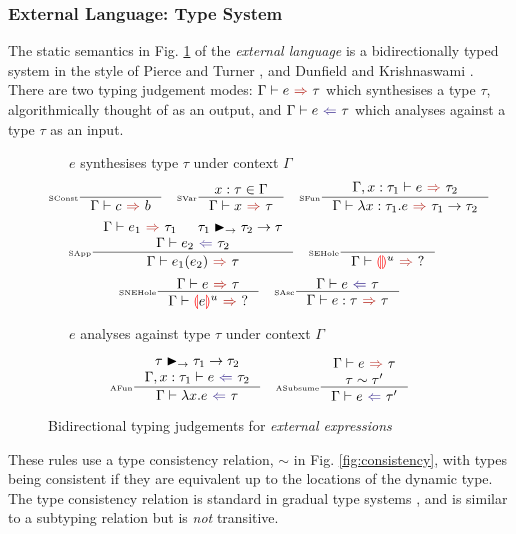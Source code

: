 \subsubsection{External Language: Type System}
The static semantics in Fig. \ref{fig:typing} of the \textit{external language} is a bidirectionally typed system in the style of Pierce and Turner \cite{LocalInference}, and Dunfield and Krishnaswami \cite{BidirectionalTypes}. There are two typing judgement modes: $\synthesis{e}{\tau}$ which synthesises a type $\tau$, algorithmically thought of as an output, and $\analysis{e}{\tau}$ which analyses against a type $\tau$ as an input.\par 
\begin{figure}[H]
\small
{}\ \ \ $e$ synthesises type $\tau$ under context $\Gamma$
\tiny
\[\inference[\tiny SConst]{}{\synthesis{c}{b}} \quad
\inference[\tiny SVar]{x : \tau \in \Gamma}{\synthesis{x}{\tau}} \quad 
\inference[\tiny SFun]{\synthesis[\Gamma,x:\tau_1]{e}{\tau_2}}{\synthesis{\lambda x:\tau_1.e}{\tau_1 \to \tau_2}}\]
\[\inference[\tiny SApp]{\synthesis{e_1}{\tau_1} & \tau_1 \funmatch \tau_2 \to \tau \\ \analysis{e_2}{\tau_2}}{\synthesis{e_1(e_2)}{\tau}} \quad 
\inference[\tiny SEHole]{}{\synthesis{\hole^u}{?}} \quad \]
\[\inference[\tiny SNEHole]{\synthesis{e}{\tau}}{\synthesis{\hole[e]^u}{?}}\quad 
\inference[\tiny SAsc]{\analysis{e}{\tau}}{\synthesis{e : \tau}{\tau}}\]

\small
{}\ \ \ $e$ analyses against type $\tau$ under context $\Gamma$

\tiny
\[\inference[\tiny AFun]{\tau \funmatch \tau_1 \to \tau_2\\ \analysis[\Gamma, x:\tau_1]{e}{\tau_2}}{\analysis{\lambda x.e}{\tau}} \quad 
\inference[\tiny ASubsume]{\synthesis{e}{\tau}\\ \tau \sim \tau'}{\analysis{e}{\tau'}}\]

\caption{Bidirectional typing judgements for \textit{external expressions}}
\label{fig:typing}
\end{figure} 
These rules use a type consistency relation, $\sim$ in Fig. \ref{fig:consistency}, with types being consistent if they are equivalent up to the locations of the dynamic type. The type consistency relation is standard in gradual type systems \cite{GradualFunctional, GradualObjects}, and is similar to a subtyping relation but is \textit{not} transitive.

